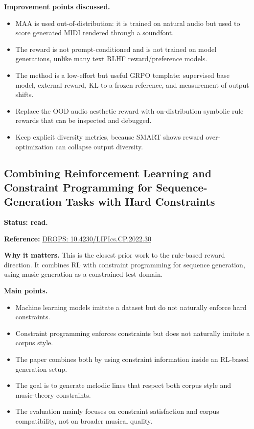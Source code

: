 \documentclass[11pt]{article}
\begin{document}
\textbf{Improvement points discussed.}
\begin{itemize}[leftmargin=*]
  \item MAA is used out-of-distribution: it is trained on natural audio but used
  to score generated MIDI rendered through a soundfont.
  \item The reward is not prompt-conditioned and is not trained on model
  generations, unlike many text RLHF reward/preference models.
  \item The method is a low-effort but useful GRPO template: supervised base
  model, external reward, KL to a frozen reference, and measurement of output
  shifts.
  \item Replace the OOD audio aesthetic reward with on-distribution symbolic rule
  rewards that can be inspected and debugged.
  \item Keep explicit diversity metrics, because SMART shows reward
  over-optimization can collapse output diversity.
\end{itemize}

\subsection{Combining Reinforcement Learning and Constraint Programming for Sequence-Generation Tasks with Hard Constraints}
\label{sec:paper-constraints}

\textbf{Status: read.}

\textbf{Reference:}
\href{https://drops.dagstuhl.de/entities/document/10.4230/LIPIcs.CP.2022.30}{DROPS: 10.4230/LIPIcs.CP.2022.30}

\textbf{Why it matters.}
This is the closest prior work to the rule-based reward direction. It combines
RL with constraint programming for sequence generation, using music generation as
a constrained test domain.

\textbf{Main points.}
\begin{itemize}[leftmargin=*]
  \item Machine learning models imitate a dataset but do not naturally enforce
  hard constraints.
  \item Constraint programming enforces constraints but does not naturally
  imitate a corpus style.
  \item The paper combines both by using constraint information inside an
  RL-based generation setup.
  \item The goal is to generate melodic lines that respect both corpus style and
  music-theory constraints.
  \item The evaluation mainly focuses on constraint satisfaction and corpus
  compatibility, not on broader musical quality.
\end{itemize}
\end{document}
